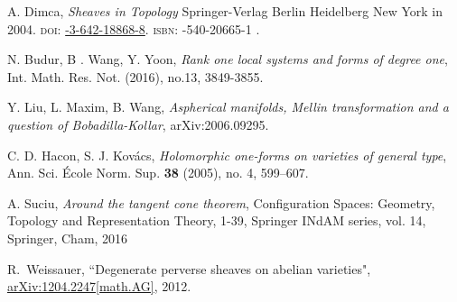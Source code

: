 \documentclass[11pt,reqno]{amsart}
\theoremstyle{definition}
\theoremstyle{remark}
\theoremstyle{cited}
\theoremstyle{citeddef}
\begin{document}
\begin{thebibliography}{ADMSP}

 A. Dimca, {\it Sheaves in Topology} Springer-Verlag Berlin Heidelberg New York in 2004.
\textsc{doi:} \href{https://doi.org/10.10071978-3-642-18868-8}{-3-642-18868-8}.
\textsc{isbn:} {-540-20665-1 }.

 N. Budur, B . Wang, Y. Yoon, {\it Rank one local systems and forms of degree one}, Int. Math. Res. Not. (2016), no.13, 3849-3855.


 Y. Liu, L. Maxim, B. Wang, \textit{Aspherical manifolds, Mellin transformation and a question of Bobadilla-Kollar}, arXiv:2006.09295.

 C. D. Hacon, S. J. Kov\'acs, \textit{Holomorphic one-forms on varieties of general type}, Ann. Sci. \'Ecole Norm. Sup. \textbf{38} (2005), no. 4, 599--607.


 A. Suciu, {\it Around the tangent cone theorem}, Configuration Spaces: Geometry, Topology and Representation Theory, 1-39, Springer INdAM series, vol. 14, Springer, Cham, 2016

 R.\ Weissauer, ``Degenerate perverse sheaves on abelian varieties", \href{https://arxiv.org/abs/1204.2247}{\ttfamily arXiv:1204.2247[math.AG]}, 2012.




\end{thebibliography}



\end{document}
